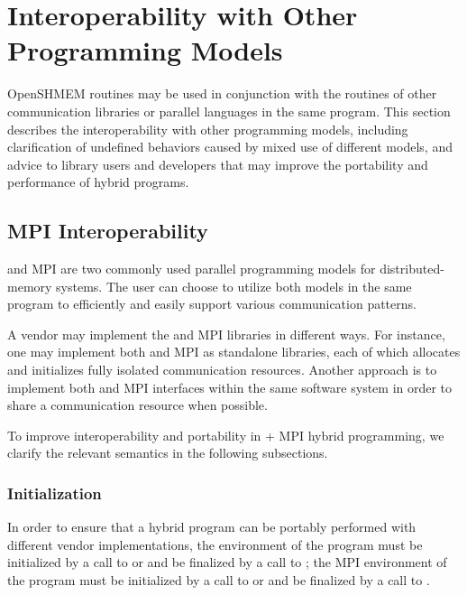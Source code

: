 \chapter{Interoperability with Other Programming Models}\label{sec:interoperability}

OpenSHMEM routines may be used in conjunction with the routines of other
communication libraries or parallel languages in the same program. This section
describes the interoperability with other programming models, including
clarification of undefined behaviors caused by mixed use of different models,
and advice to \openshmem library users and developers that may improve the portability
and performance of hybrid programs.


\section{\ac{MPI} Interoperability}

\openshmem and \ac{MPI} are two commonly used parallel programming models for
distributed-memory systems. The user can choose to utilize both models in the same program
to efficiently and easily support various communication patterns.

A vendor may implement the \openshmem and \ac{MPI} libraries in different ways. For
instance, one may implement both \openshmem and \ac{MPI} as standalone libraries,
each of which allocates and initializes fully isolated communication
resources.
Another approach
is to implement both \openshmem and \ac{MPI} interfaces within the
same software system in order to share a communication resource when possible.

To improve interoperability and portability in \openshmem + \ac{MPI} hybrid
programming, we clarify the relevant semantics in the following subsections.


\subsection{Initialization}
In order to ensure that a hybrid program can be portably performed with different vendor
implementations, the \openshmem environment of the program must be initialized by
a call to  or  and be finalized by
a call to ; the \ac{MPI} environment of the program must be initialized
by a call to  or  and be finalized by a
call to .



